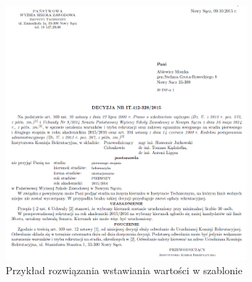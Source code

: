  
 
\begin{figure}
    \centering
    \includegraphics[width=0.8\textwidth]{rys/szablony/wstawianie.png}
    \caption{Przykład rozwiązania wstawiania wartości w szablonie}
    \label{fig:wstawianie}
\end{figure}



 
